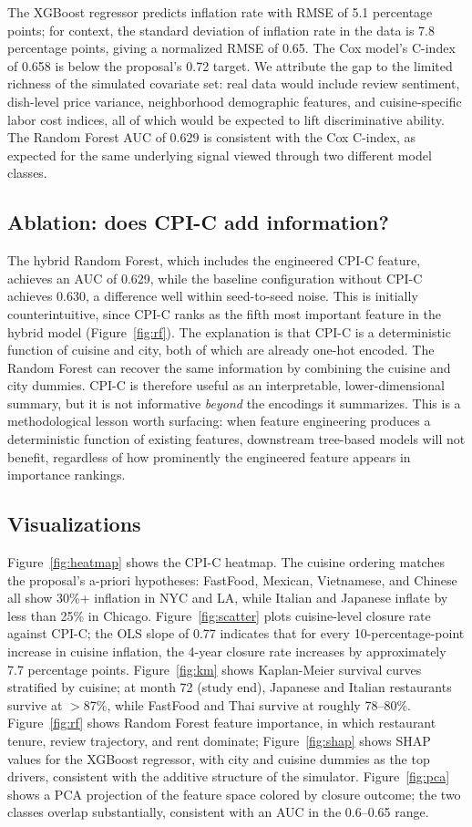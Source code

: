 \documentclass{article}
\begin{document}
The XGBoost regressor predicts inflation rate with RMSE of 5.1 percentage points; for context, the standard deviation of inflation rate in the data is 7.8 percentage points, giving a normalized RMSE of 0.65. The Cox model's C-index of 0.658 is below the proposal's 0.72 target. We attribute the gap to the limited richness of the simulated covariate set: real data would include review sentiment, dish-level price variance, neighborhood demographic features, and cuisine-specific labor cost indices, all of which would be expected to lift discriminative ability. The Random Forest AUC of 0.629 is consistent with the Cox C-index, as expected for the same underlying signal viewed through two different model classes.

\subsection{Ablation: does CPI-C add information?}
The hybrid Random Forest, which includes the engineered CPI-C feature, achieves an AUC of 0.629, while the baseline configuration without CPI-C achieves 0.630, a difference well within seed-to-seed noise. This is initially counterintuitive, since CPI-C ranks as the fifth most important feature in the hybrid model (Figure~\ref{fig:rf}). The explanation is that CPI-C is a deterministic function of cuisine and city, both of which are already one-hot encoded. The Random Forest can recover the same information by combining the cuisine and city dummies. CPI-C is therefore useful as an interpretable, lower-dimensional summary, but it is not informative \emph{beyond} the encodings it summarizes. This is a methodological lesson worth surfacing: when feature engineering produces a deterministic function of existing features, downstream tree-based models will not benefit, regardless of how prominently the engineered feature appears in importance rankings.

\subsection{Visualizations}
Figure~\ref{fig:heatmap} shows the CPI-C heatmap. The cuisine ordering matches the proposal's a-priori hypotheses: FastFood, Mexican, Vietnamese, and Chinese all show 30\%+ inflation in NYC and LA, while Italian and Japanese inflate by less than 25\% in Chicago. Figure~\ref{fig:scatter} plots cuisine-level closure rate against CPI-C; the OLS slope of 0.77 indicates that for every 10-percentage-point increase in cuisine inflation, the 4-year closure rate increases by approximately 7.7 percentage points. Figure~\ref{fig:km} shows Kaplan-Meier survival curves stratified by cuisine; at month 72 (study end), Japanese and Italian restaurants survive at $>$87\%, while FastFood and Thai survive at roughly 78--80\%. Figure~\ref{fig:rf} shows Random Forest feature importance, in which restaurant tenure, review trajectory, and rent dominate; Figure~\ref{fig:shap} shows SHAP values for the XGBoost regressor, with city and cuisine dummies as the top drivers, consistent with the additive structure of the simulator. Figure~\ref{fig:pca} shows a PCA projection of the feature space colored by closure outcome; the two classes overlap substantially, consistent with an AUC in the 0.6--0.65 range.
\end{document}
